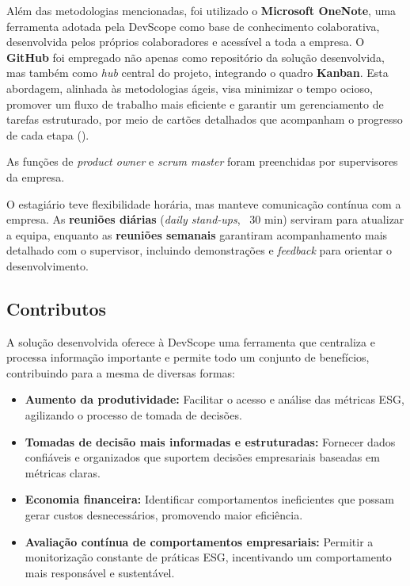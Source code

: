 Além das metodologias mencionadas, foi utilizado o \textbf{Microsoft OneNote}, uma ferramenta adotada pela DevScope como base de conhecimento colaborativa, desenvolvida pelos próprios colaboradores e acessível a toda a empresa. O \textbf{GitHub} foi empregado não apenas como repositório da solução desenvolvida, mas também como \textit{hub} central do projeto, integrando o quadro \textbf{Kanban}. Esta abordagem, alinhada às metodologias ágeis, visa minimizar o tempo ocioso, promover um fluxo de trabalho mais eficiente e garantir um gerenciamento de tarefas estruturado, por meio de cartões detalhados que acompanham o progresso de cada etapa (\cite{Wakode2021Kanban}).

As funções de \textit{product owner} e \textit{scrum master} foram preenchidas por supervisores da empresa.

O estagiário teve flexibilidade horária, mas manteve comunicação contínua com a empresa. As \textbf{reuniões diárias} (\textit{daily stand-ups}, ~30 min) serviram para atualizar a equipa, enquanto as \textbf{reuniões semanais} garantiram acompanhamento mais detalhado com o supervisor, incluindo demonstrações e \textit{feedback} para orientar o desenvolvimento.

\subsection{Contributos} 

A solução desenvolvida oferece à DevScope uma ferramenta que centraliza e processa informação importante e permite todo um conjunto de benefícios, contribuindo para a mesma de diversas formas:
\begin{itemize}
  \item \textbf{Aumento da produtividade:} Facilitar o acesso e análise das métricas ESG, agilizando o processo de tomada de decisões.
  \item \textbf{Tomadas de decisão mais informadas e estruturadas:} Fornecer dados confiáveis e organizados que suportem decisões empresariais baseadas em métricas claras.
  \item \textbf{Economia financeira:} Identificar comportamentos ineficientes que possam gerar custos desnecessários, promovendo maior eficiência.
  \item \textbf{Avaliação contínua de comportamentos empresariais:} Permitir a monitorização constante de práticas ESG, incentivando um comportamento mais responsável e sustentável.
\end{itemize}


